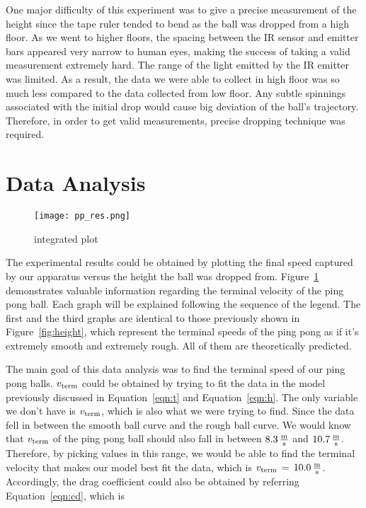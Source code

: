 \documentclass{article}
\begin{document}
\noindent One major difficulty of this experiment was to give a precise measurement of the height since the tape ruler tended to bend as the ball was dropped from a high floor. As we went to higher floors, the spacing between the IR sensor and emitter bars appeared very narrow to human eyes, making the success of taking a valid measurement extremely hard. The range of the light emitted by the IR emitter was limited. As a result, the data we were able to collect in high floor was so much less compared to the data collected from low floor. Any subtle spinnings associated with the initial drop would cause big deviation of the ball's trajectory. Therefore, in order to get valid measurements, precise dropping technique was required. 

\section{Data Analysis}

\begin{figure}[H]
\centering
\texttt{[image: pp\_res.png]}
\caption{integrated plot}
\label{fig:results}
\end{figure}

\noindent The experimental results could be obtained by plotting the final speed captured by our apparatus versus the height the ball was dropped from. Figure~\ref{fig:results} demonstrates valuable information regarding the terminal velocity of the ping pong ball. Each graph will be explained following the sequence of the legend. The first and the third graphs are identical to those previously shown in Figure~\ref{fig:height}, which represent the terminal speeds of the ping pong as if it's extremely smooth and extremely rough. All of them are theoretically predicted. 

\noindent The main goal of this data analysis was to find the terminal speed of our ping pong balls. $v_{\textnormal{term}}$ could be obtained by trying to fit the data in the model previously discussed in Equation~\ref{eqn:t} and Equation~\ref{eqn:h}. The only variable we don't have is $v_{\textnormal{term}}$, which is also what we were trying to find. Since the data fell in between the smooth ball curve and the rough ball curve. We would know that $v_{\textnormal{term}}$ of the ping pong ball should also fall in between $8.3\,\frac{\textnormal{m}}{\textnormal{s}}$ and $10.7\,\frac{\textnormal{m}}{\textnormal{s}}$. Therefore, by picking values in this range, we would be able to find the terminal velocity that makes our model best fit the data, which is $v_{\textnormal{term}}\,=\,10.0\,\frac{\textnormal{m}}{\textnormal{s}}$. Accordingly, the drag coefficient could also be obtained by referring Equation~\ref{eqn:cd}, which is
\end{document}
